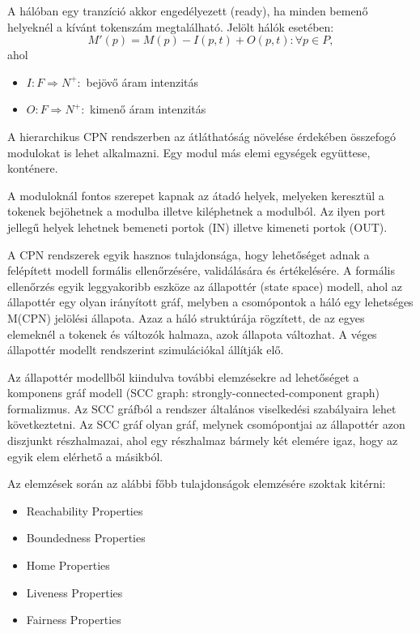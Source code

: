 A hálóban egy tranzíció akkor engedélyezett (ready), ha minden bemenő helyeknél a kívánt tokenszám megtalálható.   Jelölt hálók esetében:
$$M'(p)=M(p)-I(p,t)+O(p,t): \forall p\in P,$$ ahol 
\begin{itemize}
\item $I:F\Rightarrow N^+:$  bejövő áram intenzitás
\item $O:F\Rightarrow N^+:$ kimenő áram intenzitás

\end{itemize}
A hierarchikus CPN rendszerben az átláthatóság növelése érdekében összefogó modulokat is lehet alkalmazni. Egy modul más elemi egységek együttese, konténere. %

A moduloknál fontos szerepet kapnak az átadó helyek, melyeken keresztül a tokenek bejöhetnek a modulba illetve kiléphetnek a modulból. Az ilyen port jellegű helyek lehetnek bemeneti portok (IN) illetve kimeneti portok (OUT).  

A CPN rendszerek egyik hasznos tulajdonsága, hogy lehetőséget adnak a felépített modell formális ellenőrzésére, validálására és értékelésére. A formális ellenőrzés egyik leggyakoribb eszköze az állapottér (state space)  modell, ahol az állapottér egy olyan irányított gráf, melyben a csomópontok a háló egy lehetséges  M(CPN) jelölési állapota. Azaz a háló struktúrája rögzített, de az egyes elemeknél a tokenek és változók halmaza, azok állapota változhat. A véges állapottér modellt rendszerint szimulációkal állítják elő. 

Az állapottér modellből kiindulva további elemzésekre ad lehetőséget a komponens gráf modell (SCC graph:  strongly-connected-component graph) formalizmus. Az  SCC gráfból a rendszer általános viselkedési szabályaira lehet következtetni. Az SCC gráf olyan gráf, melynek csomópontjai  az állapottér azon diszjunkt részhalmazai, ahol egy részhalmaz bármely két elemére igaz, hogy az egyik elem  elérhető a másikból. 

Az elemzések során az alábbi főbb tulajdonságok elemzésére szoktak kitérni:
\begin{itemize}
\item Reachability Properties
\item Boundedness Properties
\item Home Properties 
\item Liveness Properties
\item Fairness Properties
\end{itemize}

